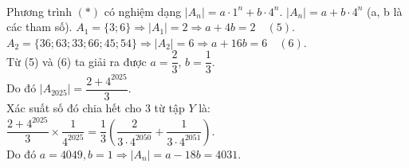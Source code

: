 \begin{ex}
{	\\Phương trình $(*)$ có nghiệm dạng $|A_n| = a \cdot 1^n + b \cdot 4^n$. $|A_n| = a + b \cdot 4^n$ (a, b là các tham số).
	$A_1 = \{3; 6\} \Rightarrow |A_1| = 2 \Rightarrow a+4b = 2 \quad (5)$.
	\\$A_2 = \{36; 63; 33; 66; 45; 54\} \Rightarrow |A_2| = 6 \Rightarrow a+16b = 6 \quad (6)$.
		\\Từ (5) và (6) ta giải ra được $a = \dfrac{2}{3}$, $b = \dfrac{1}{3}$.
		\\Do đó $|A_{2025}| = \dfrac{2+4^{2025}}{3}$.
		\\Xác suất số đó chia hết cho 3 từ tập $Y$ là:
	$\dfrac{2+4^{2025}}{3} \times \dfrac{1}{4^{2025}} = \dfrac{1}{3} (\dfrac{2}{3 \cdot 4^{2050}} + \dfrac{1}{3 \cdot 4^{2051}})$.
		\\ Do đó $a = 4049, b = 1 \Rightarrow |A_{n}| = a - 18b = 4031$.}
\end{ex}
